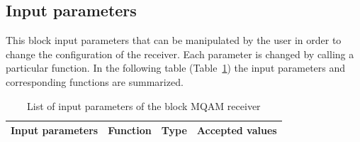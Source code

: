 \subsection*{Input parameters}

This block input parameters that can be manipulated by the user in
order to change the configuration of the receiver. Each parameter is changed by
calling a
particular function. In the following table
(Table~\ref{tab:homodyneRx_params}) the input parameters and corresponding
functions are
summarized.
%
\begin{table}[h]
	\begin{center}
		\begin{tabular}{| m{} | m{} |  m{} | m{4cm} | }
			\hline
			\textbf{Input parameters} & \textbf{Function} & \textbf{Type} &
			\textbf{Accepted values} \\ \hline
		\end{tabular}
		\caption{List of input parameters of the block MQAM receiver}
		\label{tab:homodyneRx_params}
	\end{center}
\end{table}
%

